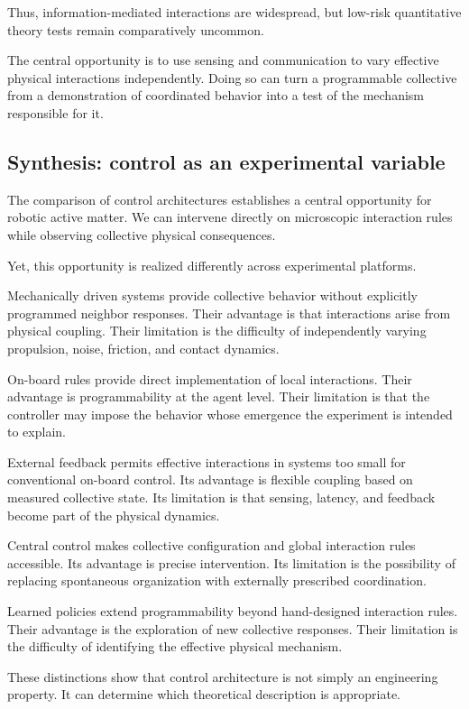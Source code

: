 Thus, information-mediated interactions
are widespread, but low-risk
quantitative theory tests remain
comparatively uncommon.

The central opportunity is to use
sensing and communication to vary
effective physical interactions
independently. Doing so can turn
a programmable collective from
a demonstration of coordinated
behavior into a test of the
mechanism responsible for it.

\subsection{Synthesis: control as an experimental variable}
\label{sec:control-synthesis}

The comparison of control architectures establishes
a central opportunity for robotic active matter.
We can intervene directly on microscopic
interaction rules while observing collective
physical consequences.

Yet, this opportunity is realized differently
across experimental platforms.

Mechanically driven systems provide collective
behavior without explicitly programmed
neighbor responses. Their advantage is that
interactions arise from physical coupling.
Their limitation is the difficulty of
independently varying propulsion,
noise, friction, and contact dynamics.

On-board rules provide direct implementation
of local interactions. Their advantage is
programmability at the agent level.
Their limitation is that the controller
may impose the behavior whose emergence
the experiment is intended to explain.

External feedback permits effective
interactions in systems too small
for conventional on-board control.
Its advantage is flexible coupling
based on measured collective state.
Its limitation is that sensing,
latency, and feedback become
part of the physical dynamics.

Central control makes collective
configuration and global interaction
rules accessible. Its advantage
is precise intervention.
Its limitation is the possibility
of replacing spontaneous
organization with externally
prescribed coordination.

Learned policies extend
programmability beyond
hand-designed interaction
rules. Their advantage
is the exploration
of new collective
responses.
Their limitation
is the difficulty
of identifying
the effective
physical mechanism.

These distinctions
show that control
architecture is
not simply an
engineering property.
It can determine
which theoretical
description is
appropriate.

